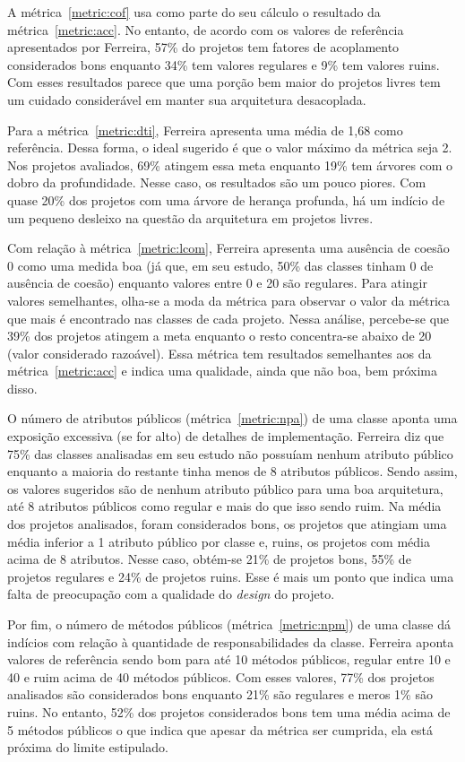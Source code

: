 A métrica~\ref{metric:cof} usa como parte do seu cálculo o resultado
da métrica~\ref{metric:acc}. No entanto, de acordo com os valores de
referência apresentados por Ferreira, 57\% do projetos tem fatores de
acoplamento considerados bons enquanto 34\% tem valores regulares e
9\% tem valores ruins. Com esses resultados parece que uma porção bem
maior do projetos livres tem um cuidado considerável em manter sua
arquitetura desacoplada.

Para a métrica~\ref{metric:dti}, Ferreira apresenta uma média de 1,68
como referência. Dessa forma, o ideal sugerido é que o valor máximo da
métrica seja 2. Nos projetos avaliados, 69\% atingem essa meta
enquanto 19\% tem árvores com o dobro da profundidade. Nesse caso, os
resultados são um pouco piores. Com quase 20\% dos projetos com uma
árvore de herança profunda, há um indício de um pequeno desleixo na
questão da arquitetura em projetos livres.

Com relação à métrica~\ref{metric:lcom}, Ferreira apresenta uma
ausência de coesão 0 como uma medida boa (já que, em seu estudo, 50\%
das classes tinham 0 de ausência de coesão) enquanto valores entre 0 e
20 são regulares. Para atingir valores semelhantes, olha-se a moda da
métrica para observar o valor da métrica que mais é encontrado nas
classes de cada projeto. Nessa análise, percebe-se que 39\% dos
projetos atingem a meta enquanto o resto concentra-se abaixo de 20
(valor considerado razoável). Essa métrica tem resultados semelhantes
aos da métrica~\ref{metric:acc} e indica uma qualidade, ainda que não
boa, bem próxima disso.

O número de atributos públicos (métrica~\ref{metric:npa}) de uma
classe aponta uma exposição excessiva (se for alto) de detalhes de
implementação. Ferreira diz que 75\% das classes analisadas em seu
estudo não possuíam nenhum atributo público enquanto a maioria do
restante tinha menos de 8 atributos públicos. Sendo assim, os valores
sugeridos são de nenhum atributo público para uma boa arquitetura, até
8 atributos públicos como regular e mais do que isso sendo ruim. Na
média dos projetos analisados, foram considerados bons, os projetos
que atingiam uma média inferior a 1 atributo público por classe e,
ruins, os projetos com média acima de 8 atributos. Nesse caso,
obtém-se 21\% de projetos bons, 55\% de projetos regulares e 24\% de
projetos ruins. Esse é mais um ponto que indica uma falta de
preocupação com a qualidade do \textit{design} do projeto.

Por fim, o número de métodos públicos (métrica~\ref{metric:npm}) de
uma classe dá indícios com relação à quantidade de responsabilidades
da classe. Ferreira aponta valores de referência sendo bom para até 10
métodos públicos, regular entre 10 e 40 e ruim acima de 40 métodos
públicos. Com esses valores, 77\% dos projetos analisados são
considerados bons enquanto 21\% são regulares e meros 1\% são
ruins. No entanto, 52\% dos projetos considerados bons tem uma média
acima de 5 métodos públicos o que indica que apesar da métrica ser
cumprida, ela está próxima do limite estipulado.

